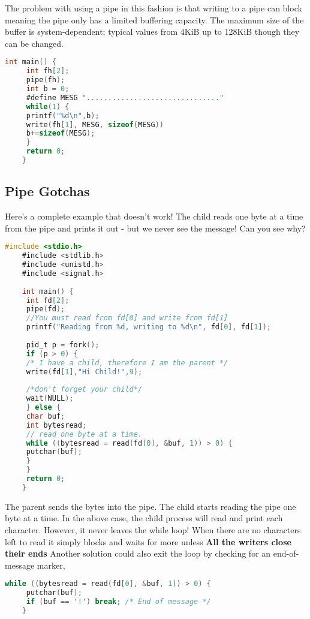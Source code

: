 The problem with using a pipe in this fashion is that writing to a pipe can block meaning the pipe only has a limited buffering capacity.
The maximum size of the buffer is system-dependent; typical values from 4KiB up to 128KiB though they can be changed.
	 
\begin{lstlisting}[language=C]
	int main() {
	 int fh[2];
	 pipe(fh);
	 int b = 0;
	 #define MESG "..............................."
	 while(1) {
	 printf("%d\n",b);
	 write(fh[1], MESG, sizeof(MESG))
	 b+=sizeof(MESG);
	 }
	 return 0;
	}
\end{lstlisting}
	 
\subsection{Pipe Gotchas}
	 
Here's a complete example that doesn't work!
The child reads one byte at a time from the pipe and prints it out - but we never see the message!
Can you see why?
	 
\begin{lstlisting}[language=C]
	#include <stdio.h>
	#include <stdlib.h>
	#include <unistd.h>
	#include <signal.h>
	 
	int main() {
	 int fd[2];
	 pipe(fd);
	 //You must read from fd[0] and write from fd[1]
	 printf("Reading from %d, writing to %d\n", fd[0], fd[1]);
	 
	 pid_t p = fork();
	 if (p > 0) {
	 /* I have a child, therefore I am the parent */
	 write(fd[1],"Hi Child!",9);
	 
	 /*don't forget your child*/
	 wait(NULL);
	 } else {
	 char buf;
	 int bytesread;
	 // read one byte at a time.
	 while ((bytesread = read(fd[0], &buf, 1)) > 0) {
	 putchar(buf);
	 }
	 }
	 return 0;
	}
\end{lstlisting}
	 
The parent sends the bytes  into the pipe.
The child starts reading the pipe one byte at a time.
In the above case, the child process will read and print each character.
However, it never leaves the while loop!
When there are no characters left to read it simply blocks and waits for more unless \textbf{All the writers close their ends}
Another solution could also exit the loop by checking for an end-of-message marker,
	 
\begin{lstlisting}[language=C]
	while ((bytesread = read(fd[0], &buf, 1)) > 0) {
	 putchar(buf);
	 if (buf == '!') break; /* End of message */
	}
\end{lstlisting}
	 
